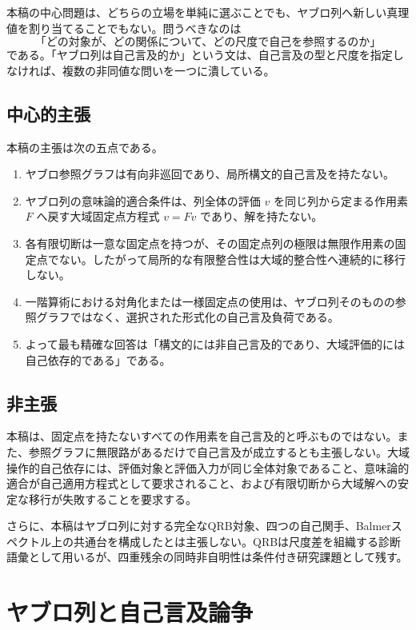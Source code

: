 \documentclass[a4paper,11pt]{ltjsarticle}
\theoremstyle{definition}
\theoremstyle{plain}
\begin{document}
本稿の中心問題は、どちらの立場を単純に選ぶことでも、ヤブロ列へ新しい真理値を割り当てることでもない。問うべきなのは
\begin{equation}
 \text{「どの対象が、どの関係について、どの尺度で自己を参照するのか」}
 \label{eq:typed-question}
\end{equation}
である。「ヤブロ列は自己言及的か」という文は、自己言及の型と尺度を指定しなければ、複数の非同値な問いを一つに潰している。

\subsection{中心的主張}

本稿の主張は次の五点である。
\begin{enumerate}
 \item ヤブロ参照グラフは有向非巡回であり、局所構文的自己言及を持たない。
 \item ヤブロ列の意味論的適合条件は、列全体の評価 $v$ を同じ列から定まる作用素 $F$ へ戻す大域固定点方程式 $v=Fv$ であり、解を持たない。
 \item 各有限切断は一意な固定点を持つが、その固定点列の極限は無限作用素の固定点でない。したがって局所的な有限整合性は大域的整合性へ連続的に移行しない。
 \item 一階算術における対角化または一様固定点の使用は、ヤブロ列そのものの参照グラフではなく、選択された形式化の自己言及負荷である。
 \item よって最も精確な回答は「構文的には非自己言及的であり、大域評価的には自己依存的である」である。
\end{enumerate}

\subsection{非主張}

本稿は、固定点を持たないすべての作用素を自己言及的と呼ぶものではない。また、参照グラフに無限路があるだけで自己言及が成立するとも主張しない。大域操作的自己依存には、評価対象と評価入力が同じ全体対象であること、意味論的適合が自己適用方程式として要求されること、および有限切断から大域解への安定な移行が失敗することを要求する。

さらに、本稿はヤブロ列に対する完全なQRB対象、四つの自己関手、Balmerスペクトル上の共通台を構成したとは主張しない。QRBは尺度差を組織する診断語彙として用いるが、四重残余の同時非自明性は条件付き研究課題として残す。

\section{ヤブロ列と自己言及論争}
\end{document}
